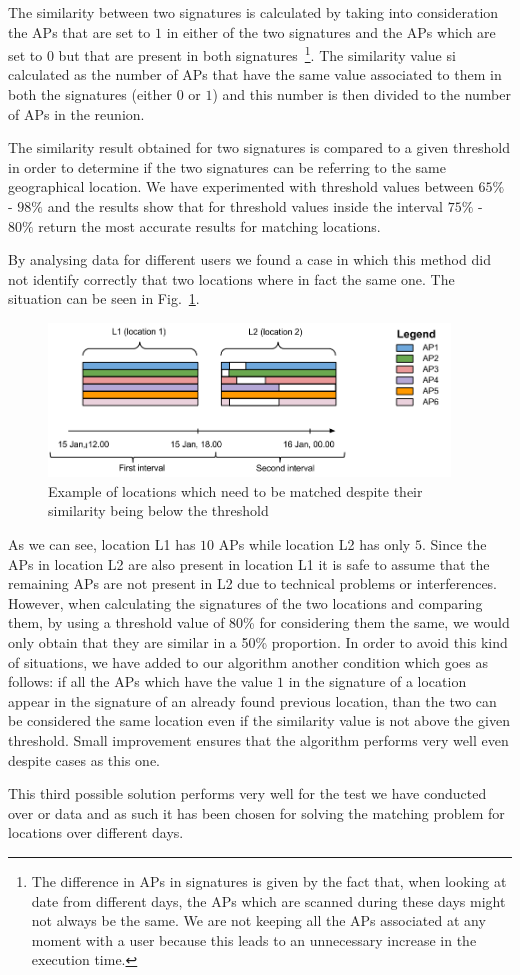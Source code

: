 The similarity between two signatures is calculated by taking into consideration
the APs that are set to $1$ in either of the two signatures and the APs which
are set to $0$ but that are present in both signatures~\footnote{The difference
in APs in signatures is given by the fact that, when looking at date from
different days, the APs which are scanned during these days might not always be
the same. We are not keeping all the APs associated at any moment with a user
because this leads to an unnecessary increase in the execution time.}. The
similarity value si calculated as the number of APs that have the same value
associated to them in both the signatures (either $0$ or $1$) and this number is
then divided to the number of APs in the reunion.

The similarity result obtained for two signatures is compared to a given
threshold in order to determine if the two signatures can be referring to the
same geographical location. We have experimented with threshold values between
$65\%$ - $98\%$ and the results show that for threshold values inside the
interval $75\%$ - $80\%$ return the most accurate results for matching
locations.

By analysing data for different users we found a case in which this method did
not identify correctly that two locations where in fact the same one. The
situation can be seen in Fig.~\ref{same_location_less_than_threshold}.

\begin{figure}[!h]
\centering
\includegraphics[width=0.95\textwidth]{figures/matching/different_fp_same_loc.png}
\caption{Example of locations which need to be matched despite their similarity
being below the threshold}
\label{same_location_less_than_threshold}
\end{figure}

As we can see, location L1 has $10$ APs while location L2 has only $5$. Since
the APs in location L2 are also present in location L1 it is safe to assume that
the remaining APs are not present in L2 due to technical problems or
interferences. However, when calculating the signatures of the two locations and
comparing them, by using a threshold value of 80\% for considering them the
same, we would only obtain that they are similar in a 50\% proportion. In order
to avoid this kind of situations, we have added to our algorithm another
condition which goes as follows: if all the APs which have the value $1$ in the
signature of a location appear in the signature of an already found previous
location, than the two can be considered the same location even if the
similarity value is not above the given threshold. Small improvement ensures
that the algorithm performs very well even despite cases as this one.

This third possible solution performs very well for the test we have conducted
over or data and as such it has been chosen for solving the matching problem for
locations over different days.
